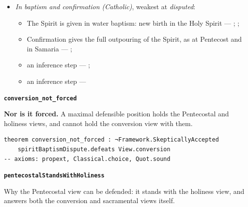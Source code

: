 \documentclass[11pt]{article}
\begin{document}
\begin{itemize}
\begin{itemize}
\item an inference step --- \cite[to Joseph Benson, 28 December 1770]{wesley-letters-1931}; \cite{bassett-white-paper-article-x-2010}
\end{itemize}
\item \emph{In baptism and confirmation (Catholic)}, weakest at \emph{disputed}:
\begin{itemize}
\item The Spirit is given in water baptism: new birth in the Holy Spirit --- \cite[1262]{catholic-church-catechism-2000}; \cite[1265]{catholic-church-catechism-2000}; \cite[Small Catechism, Baptism, third part]{kolb-wengert-book-of-concord-2000}
\item Confirmation gives the full outpouring of the Spirit, as at Pentecost and in Samaria --- \cite[1302]{catholic-church-catechism-2000}; \cite[1288]{catholic-church-catechism-2000}
\item an inference step --- \cite[1302]{catholic-church-catechism-2000}; \cite[XXVIII.6]{westminster-confession-1647}
\item an inference step --- \cite[1302]{catholic-church-catechism-2000}
\end{itemize}
\end{itemize}
\par\medskip\noindent\textbf{\texttt{conversion\_\allowbreak{}not\_\allowbreak{}forced}}\par\nobreak\noindent
\textbf{Nor is it forced.} A maximal defensible position holds the Pentecostal and holiness views, and cannot hold the conversion view with them.

{\small\begin{verbatim}
theorem conversion_not_forced : ¬Framework.SkepticallyAccepted
    spiritBaptismDispute.defeats View.conversion
-- axioms: propext, Classical.choice, Quot.sound
\end{verbatim}}
\par\medskip\noindent\textbf{\texttt{pentecostal\allowbreak{}Stands\allowbreak{}With\allowbreak{}Holiness}}\par\nobreak\noindent
Why the Pentecostal view can be defended: it stands with the holiness view, and answers both the conversion and sacramental views itself.
\end{document}
